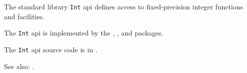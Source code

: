 
The standard library {\tt Int} api defines access to fixed-precision integer functions and facilities.

The {\tt Int} api is implemented by the , 
, 
 and 
 packages.

The {\tt Int} api source code is in .

See also:  .






